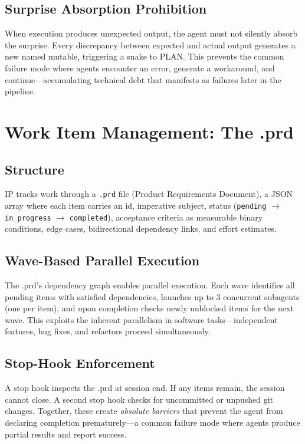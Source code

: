 \documentclass[11pt,twocolumn]{article}
\begin{document}
\subsection{Surprise Absorption Prohibition}

When execution produces unexpected output, the agent must not silently absorb the surprise. Every discrepancy between expected and actual output generates a new named mutable, triggering a snake to PLAN. This prevents the common failure mode where agents encounter an error, generate a workaround, and continue---accumulating technical debt that manifests as failures later in the pipeline.

\section{Work Item Management: The .prd}
\label{sec:prd}

\subsection{Structure}

IP tracks work through a \texttt{.prd} file (Product Requirements Document), a JSON array where each item carries an id, imperative subject, status (\texttt{pending} $\to$ \texttt{in\_progress} $\to$ \texttt{completed}), acceptance criteria as measurable binary conditions, edge cases, bidirectional dependency links, and effort estimates.

\subsection{Wave-Based Parallel Execution}

The .prd's dependency graph enables parallel execution. Each wave identifies all pending items with satisfied dependencies, launches up to 3 concurrent subagents (one per item), and upon completion checks newly unblocked items for the next wave. This exploits the inherent parallelism in software tasks---independent features, bug fixes, and refactors proceed simultaneously.

\subsection{Stop-Hook Enforcement}

A stop hook inspects the .prd at session end. If any items remain, the session cannot close. A second stop hook checks for uncommitted or unpushed git changes. Together, these create \emph{absolute barriers} that prevent the agent from declaring completion prematurely---a common failure mode where agents produce partial results and report success.
\end{document}
